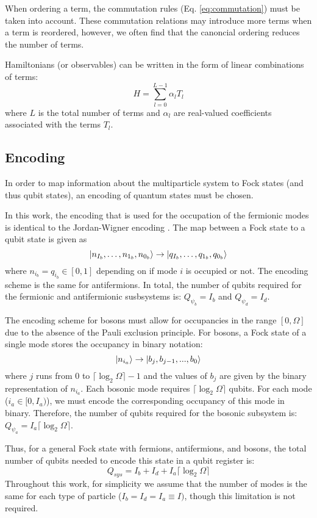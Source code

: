 When ordering a term, the commutation rules (Eq. \ref{eq:commutation}) must be taken into account.
These commutation relations may introduce more terms when a term is reordered, however, we often find that the canoncial ordering reduces the number of terms.


Hamiltonians (or observables) can be written in the form of linear combinations of terms:
\begin{equation}
    \label{eq:lclo}
    H = \sum_{l=0}^{L-1} \alpha_l T_l
\end{equation}
where $L$ is the total number of terms and $\alpha_l$ are real-valued coefficients associated with the terms $T_l$.


\subsection{Encoding}
\label{subsec:encoding}
In order to map information about the multiparticle system to Fock states (and thus qubit states), an encoding of quantum states must be chosen.

In this work, the encoding that is used for the occupation of the fermionic modes is identical to the Jordan-Wigner encoding \cite{jordan-wigner}.
The map between a Fock state to a qubit state is given as 
\begin{equation}
    \ket{n_{I_b}, \dots, n_{1_b}, n_{0_b}} \rightarrow \ket{q_{I_b}, \dots, q_{1_b}, q_{0_b}}
\end{equation}
where $n_{i_b} = q_{i_b} \in [0, 1]$ depending on if mode $i$ is occupied or not.
The encoding scheme is the same for antifermions.
In total, the number of qubits required for the fermionic and antifermionic susbsystems is: $Q_{\psi_b} = I_b$ and $Q_{\psi_d} = I_d$.

The encoding scheme for bosons must allow for occupancies in the range $[0, \Omega]$ due to the absence of the Pauli exclusion principle.
For bosons, a Fock state of a single mode stores the occupancy in binary notation: 
\begin{equation}
    \ket{n_{i_a}} \rightarrow \ket{b_j, b_{j-1}, ..., b_0}
\end{equation}
where $j$ runs from $0$ to $\lceil \log_2{\Omega} \rceil - 1$ and the values of $b_j$ are given by the binary representation of $n_{i_a}$.
Each bosonic mode requires $\lceil \log_2{\Omega} \rceil$ qubits.
For each mode ($i_a \in [0, I_a)$), we must encode the corresponding occupancy of this mode in binary. 
Therefore, the number of qubits required for the bosonic subsystem is: $Q_{\psi_a} = I_a \lceil \log_2{\Omega} \rceil$.

Thus, for a general Fock state with fermions, antifermions, and bosons, the total number of qubits needed to encode this state in a qubit register is:
\begin{equation}
    Q_{sys} = I_b + I_d + I_a \lceil \log_2{\Omega} \rceil
\end{equation}
Throughout this work, for simplicity we assume that the number of modes is the same for each type of particle ($I_b = I_d = I_a \equiv I)$, though this limitation is not required.


